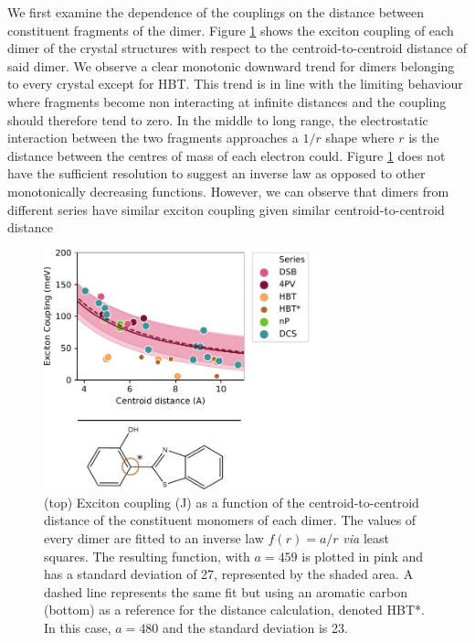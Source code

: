 We first examine the dependence of the couplings on the distance between constituent fragments of the dimer. Figure \ref{fig:dist} shows the exciton coupling of each dimer of the crystal structures with respect to the centroid-to-centroid distance of said dimer. We observe a clear monotonic downward trend for dimers belonging to every crystal except for HBT. This trend is in line with the limiting behaviour where fragments become non interacting at infinite distances and the coupling should therefore tend to zero. In the middle to long range, the electrostatic interaction between the two fragments approaches a $1/r$ shape where $r$ is the distance between the centres of mass of each electron could. Figure \ref{fig:dist} does not have the sufficient resolution to suggest an inverse law as opposed to other monotonically decreasing functions. However, we can observe that dimers from different series have similar exciton coupling given similar centroid-to-centroid distance 

\begin{figure} [h!]
\centering
\includegraphics[width=8cm]{Chapters/7Applications/dist_coupling.pdf}
\caption{(top) Exciton coupling (J) as a function of the centroid-to-centroid distance of the constituent monomers of each dimer. The values of every dimer are fitted to an inverse law $f(r) = a/r$ \textit{via} least squares. The resulting function, with $a=459$ is plotted in pink and has a standard deviation of 27, represented by the shaded area. A dashed line represents the same fit but using an aromatic carbon (bottom) as a reference for the distance calculation, denoted HBT*. In this case, $a=480$ and the standard deviation is 23.}
\label{fig:dist}
\end{figure}

